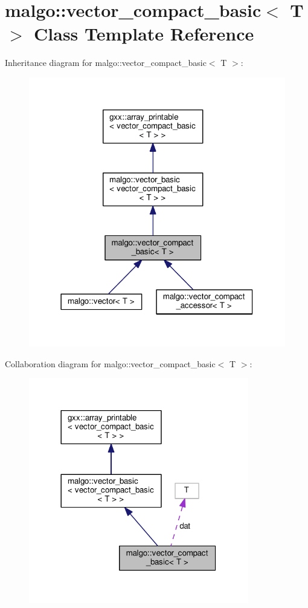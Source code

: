 \hypertarget{classmalgo_1_1vector__compact__basic}{}\section{malgo\+:\+:vector\+\_\+compact\+\_\+basic$<$ T $>$ Class Template Reference}
\label{classmalgo_1_1vector__compact__basic}


Inheritance diagram for malgo\+:\+:vector\+\_\+compact\+\_\+basic$<$ T $>$\+:
\nopagebreak
\begin{figure}[H]
\begin{center}
\leavevmode
\includegraphics[width=318pt]{classmalgo_1_1vector__compact__basic__inherit__graph}
\end{center}
\end{figure}


Collaboration diagram for malgo\+:\+:vector\+\_\+compact\+\_\+basic$<$ T $>$\+:
\nopagebreak
\begin{figure}[H]
\begin{center}
\leavevmode
\includegraphics[width=272pt]{classmalgo_1_1vector__compact__basic__coll__graph}
\end{center}
\end{figure}
